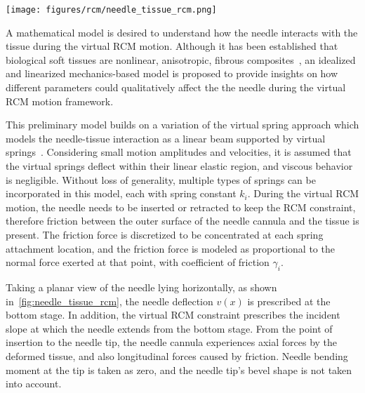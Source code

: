 \begin{figure*}[t]
  \centering
  \texttt{[image: figures/rcm/needle\_tissue\_rcm.png]}
  \caption{A planar view of virtual RCM motion of a needle inserted into an $N$-layer medium. The top and bottom stage displacements enforce the virtual RCM constraint ($m_2$ and $k_b$). The needle displaces the medium, generating an unknown reactive force distribution $F(x)$, which consists of normal force and friction force exerted by the medium. The mediums are modeled as a parallel arrangement of virtual springs, each with spring constants $k_i$ and friction coefficients $\gamma_i$. Along the inserted depth $l$, each spring is attached at end node of needle segment of length $l/n$. The reactive force deflects the needle to some shape $u(x)$, and causing the needle to intersect the $x$-axis at the instant center of motion (COM) where zero net displacement occurs.}
  \label{fig:needle_tissue_rcm}
\end{figure*}

A mathematical model is desired to understand how the needle interacts with the tissue during the virtual RCM motion. Although it has been established that biological soft tissues are nonlinear, anisotropic, fibrous composites~\parencite{petersonBiomechanicsPrinciplesApplications2007}, an idealized and linearized mechanics-based model is proposed to provide insights on how different parameters could qualitatively affect the the needle during the virtual RCM motion framework.

This preliminary model builds on a variation of the virtual spring approach which models the needle-tissue interaction as a linear beam supported by virtual springs~\parencite{glozmanImageGuidedRoboticFlexible2007,lehmannDeflectionModelingNeedle2017}. Considering small motion amplitudes and velocities, it is assumed that the virtual springs deflect within their linear elastic region, and viscous behavior is negligible. Without loss of generality, multiple types of springs can be incorporated in this model, each with spring constant $k_i$.
During the virtual RCM motion, the needle needs to be inserted or retracted to keep the RCM constraint, therefore friction between the outer surface of the needle cannula and the tissue is present. The friction force is discretized to be concentrated at each spring attachment location, and the friction force is modeled as proportional to the normal force exerted at that point, with coefficient of friction $\gamma_i$.

Taking a planar view of the needle lying horizontally, as shown in~\cref{fig:needle_tissue_rcm}, the needle deflection $v(x)$ is prescribed at the bottom stage. In addition, the virtual RCM constraint prescribes the incident slope at which the needle extends from the bottom stage. From the point of insertion to the needle tip, the needle cannula experiences axial forces by the deformed tissue, and also longitudinal forces caused by friction. Needle bending moment at the tip is taken as zero, and the needle tip's bevel shape is not taken into account.

